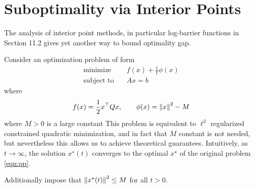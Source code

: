 \documentclass[12pt]{article}
\begin{document}
\section{Suboptimality via Interior Points}

The analysis of interior point methods, in particular log-barrier functions
in~\cite{boyd2004convex} Section 11.2
gives yet another way to bound optimality gap.

Consider an optimization problem of form
\begin{align}
  \text{minimize}&\quad f(x) + \frac{1}{t} \phi(x) \label{eqn:fake-barrier} \\
  \text{subject to}&\quad Ax = b \nonumber
\end{align}
where
\begin{align*}
  f(x) = \frac{1}{2} x^\top Q x,
    \qquad \phi(x) = {\left\lVert x\right\rVert}^2 - M
\end{align*}
where \(M > 0\) is a large constant
This problem is equivalent to \(\ell^2\) regularized constrained
quadratic minimization,
and in fact that \(M\) constant is not needed, but nevertheless
this allows us to achieve theoretical guarantees.
Intuitively, as \(t \to \infty\),
the solution \(x^\star (t)\) converges to the optimal \(x^\star\)
of the original problem \eqref{eqn:qp}.

Additionally impose that \({\left\lVert x^\star (t)\right\rVert}^2 \leq M\) for all \(t > 0\).
\end{document}
